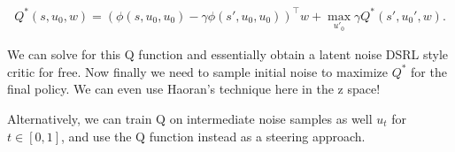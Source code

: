\begin{align}
    Q^*(s,u_0,w) = \left(\phi(s,u_0,u_0) - \gamma \phi(s',u_0,u_0)\right)^\top w + \max_{u'_0} \gamma Q^*(s',u_0',w).
\end{align}

We can solve for this Q function and essentially obtain a latent noise DSRL style critic for free. Now finally we need to sample initial noise to maximize $Q^*$ for the final policy.
We can even use Haoran's technique here in the z space!

Alternatively, we can train Q on intermediate noise samples as well $u_t$ for $t\in[0,1]$, and use the Q function instead as a steering approach. 

